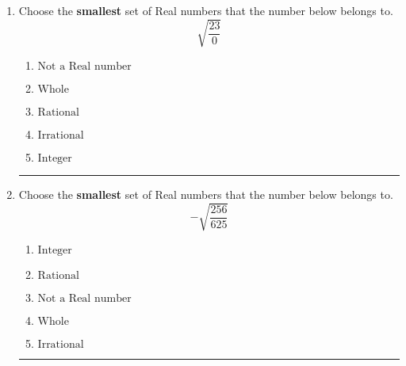 \documentclass[14pt]{extbook}
\newcommand{\litem}[1]{\item#1\hspace*{-1cm}\rule{\textwidth}{0.4pt}}
\begin{document}
\begin{enumerate}
{\begin{enumerate}[label=\Alph*.]
\end{enumerate} }
\litem{
Choose the \textbf{smallest} set of Real numbers that the number below belongs to.\[ \sqrt{\frac{23}{0}} \]\begin{enumerate}[label=\Alph*.]
\item \( \text{Not a Real number} \)
\item \( \text{Whole} \)
\item \( \text{Rational} \)
\item \( \text{Irrational} \)
\item \( \text{Integer} \)

\end{enumerate} }
\litem{
Choose the \textbf{smallest} set of Real numbers that the number below belongs to.\[ -\sqrt{\frac{256}{625}} \]\begin{enumerate}[label=\Alph*.]
\item \( \text{Integer} \)
\item \( \text{Rational} \)
\item \( \text{Not a Real number} \)
\item \( \text{Whole} \)
\item \( \text{Irrational} \)

\end{enumerate} }
\end{enumerate}
\end{document}
